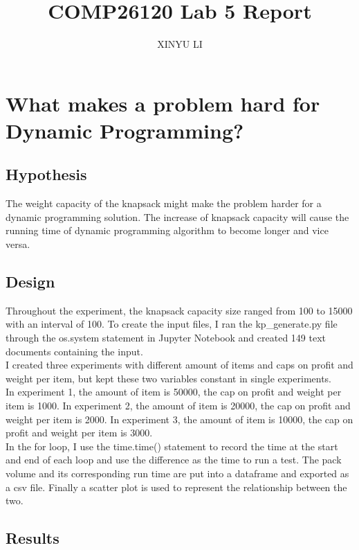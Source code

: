 \documentclass[a4]{article}
\title{COMP26120 Lab 5 Report}
\author{XINYU LI}
\begin{document}
\maketitle

\newpage
\section{What makes a problem hard for Dynamic Programming?}

\subsection{Hypothesis}

The weight capacity of the knapsack might make the problem harder for a dynamic programming solution. The increase of knapsack capacity will cause the running time of dynamic programming algorithm to become longer and vice versa.

\subsection{Design}

Throughout the experiment, the knapsack capacity size ranged from 100 to 15000 with an interval of 100. To create the input files, I ran the kp\_generate.py file through the os.system statement in Jupyter Notebook and created 149 text documents containing the input. \\

I created three experiments with different amount of items and caps on profit and weight per item, but kept these two variables constant in single experiments. \\

In experiment 1, the amount of item is 50000, the cap on profit and weight per item is 1000. In experiment 2, the amount of item is 20000, the cap on profit and weight per item is 2000. In experiment 3, the amount of item is 10000, the cap on profit and weight per item is 3000. \\

In the for loop, I use the time.time() statement to record the time at the start and end of each loop and use the difference as the time to run a test. The pack volume and its corresponding run time are put into a dataframe and exported as a csv file. Finally a scatter plot is used to represent the relationship between the two. 

\subsection{Results}
\end{document}
